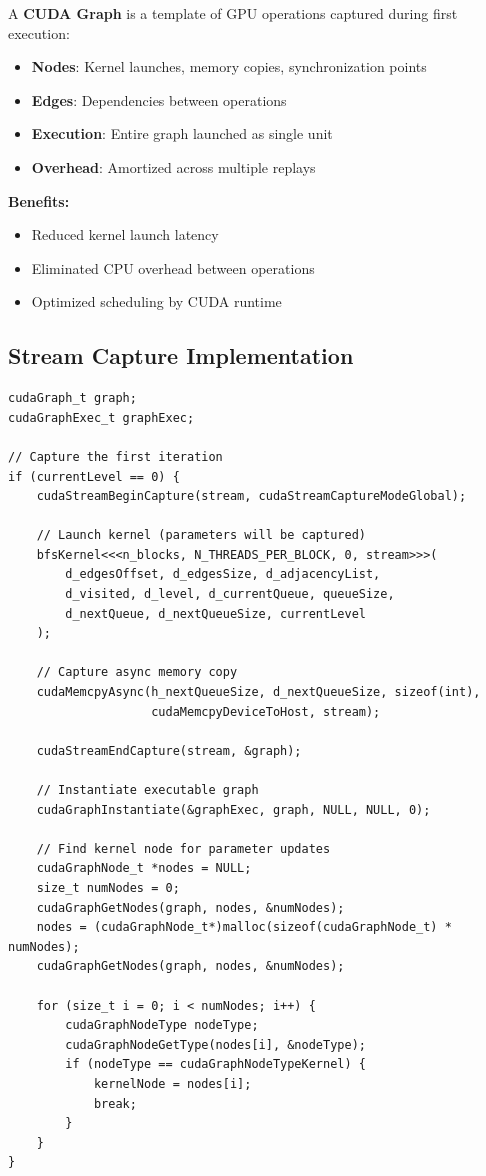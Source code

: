 \documentclass[11pt,a4paper]{article}
\begin{document}
\begin{tcolorbox}[colback=purple!5!white,colframe=purple!75!black,title=CUDA Graph Fundamentals]
A \textbf{CUDA Graph} is a template of GPU operations captured during first execution:

\begin{itemize}
    \item \textbf{Nodes}: Kernel launches, memory copies, synchronization points
    \item \textbf{Edges}: Dependencies between operations
    \item \textbf{Execution}: Entire graph launched as single unit
    \item \textbf{Overhead}: Amortized across multiple replays
\end{itemize}

\textbf{Benefits:}
\begin{itemize}
    \item Reduced kernel launch latency
    \item Eliminated CPU overhead between operations
    \item Optimized scheduling by CUDA runtime
\end{itemize}
\end{tcolorbox}

\subsection{Stream Capture Implementation}

\begin{lstlisting}[caption={CUDA Graph Creation via Stream Capture}]
cudaGraph_t graph;
cudaGraphExec_t graphExec;

// Capture the first iteration
if (currentLevel == 0) {
    cudaStreamBeginCapture(stream, cudaStreamCaptureModeGlobal);
    
    // Launch kernel (parameters will be captured)
    bfsKernel<<<n_blocks, N_THREADS_PER_BLOCK, 0, stream>>>(
        d_edgesOffset, d_edgesSize, d_adjacencyList,
        d_visited, d_level, d_currentQueue, queueSize,
        d_nextQueue, d_nextQueueSize, currentLevel
    );
    
    // Capture async memory copy
    cudaMemcpyAsync(h_nextQueueSize, d_nextQueueSize, sizeof(int),
                    cudaMemcpyDeviceToHost, stream);
    
    cudaStreamEndCapture(stream, &graph);
    
    // Instantiate executable graph
    cudaGraphInstantiate(&graphExec, graph, NULL, NULL, 0);
    
    // Find kernel node for parameter updates
    cudaGraphNode_t *nodes = NULL;
    size_t numNodes = 0;
    cudaGraphGetNodes(graph, nodes, &numNodes);
    nodes = (cudaGraphNode_t*)malloc(sizeof(cudaGraphNode_t) * numNodes);
    cudaGraphGetNodes(graph, nodes, &numNodes);
    
    for (size_t i = 0; i < numNodes; i++) {
        cudaGraphNodeType nodeType;
        cudaGraphNodeGetType(nodes[i], &nodeType);
        if (nodeType == cudaGraphNodeTypeKernel) {
            kernelNode = nodes[i];
            break;
        }
    }
}
\end{lstlisting}
\end{document}
